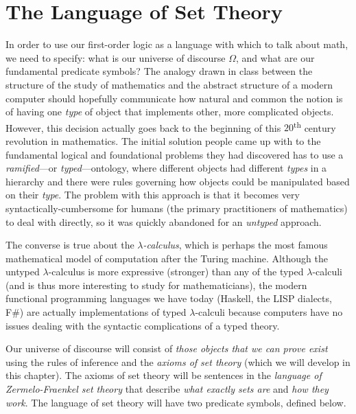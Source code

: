 \section{The Language of Set Theory}
In order to use our first-order logic as a language with which to talk about math,
we need to specify: what is our universe of discourse $\Omega$, and what are our fundamental predicate symbols?
The analogy drawn in class between the structure of the study of mathematics
and the abstract structure of a modern computer
should hopefully communicate how natural and common the notion is of having one \emph{type} of object
that implements other, more complicated objects.
However, this decision actually goes back to the beginning of
this $20$\textsuperscript{th} century revolution in mathematics.
The initial solution people came up with to the fundamental logical and foundational problems they had discovered
has to use a \emph{ramified}---or \emph{typed}---ontology,
where different objects had different \emph{types} in a hierarchy and there were rules governing how objects
could be manipulated based on their \emph{type}.
The problem with this approach is that it becomes very syntactically-cumbersome for humans
(the primary practitioners of mathematics) to deal with directly,
so it was quickly abandoned for an \emph{untyped} approach.
\vspace{-\parskip}
\begin{note}
    The converse is true about the \emph{$\lambda$-calculus},
    which is perhaps the most famous mathematical model of computation after the Turing machine.
    Although the untyped $\lambda$-calculus is more expressive (\ie stronger)
    than any of the typed $\lambda$-calculi (and is thus more interesting to study for mathematicians),
    the modern functional programming languages we have today (\eg Haskell, the LISP dialects, F\#)
    are actually implementations of typed $\lambda$-calculi
    because computers have no issues dealing with the syntactic complications of a typed theory.
\end{note}
\vspace{-\parskip}
Our universe of discourse will consist of \emph{those objects that we can prove exist}
using the rules of inference and the \emph{axioms of set theory} (which we will develop in this chapter).
The axioms of set theory will be sentences in the \emph{language of Zermelo-Fraenkel set theory}
that describe \emph{what exactly sets are} and \emph{how they work}.
The language of set theory will have two predicate symbols, defined below.

